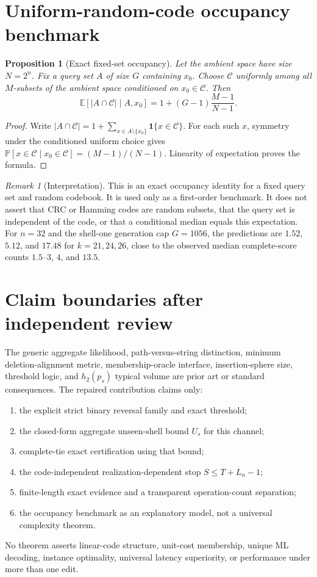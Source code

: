 \documentclass[11pt]{article}
\newtheorem{proposition}[theorem]{Proposition}
\theoremstyle{remark}\newtheorem{remark}[theorem]{Remark}
\newcommand{\C}{\mathcal C}\newcommand{\I}{\mathcal I}\newcommand{\one}{\mathbf 1}
\newcommand{\Prb}{\mathbb P}\newcommand{\ML}{\operatorname{ML}}
\begin{document}
\section{Uniform-random-code occupancy benchmark}
\begin{proposition}[Exact fixed-set occupancy]\label{prop:occupancy}
Let the ambient space have size $N=2^n$. Fix a query set $A$ of size $G$ containing $x_0$. Choose
$\C$ uniformly among all $M$-subsets of the ambient space conditioned on $x_0\in\C$. Then
\begin{equation}
 \mathbb E[|A\cap\C|\mid A,x_0]
 =1+(G-1)\frac{M-1}{N-1}. \label{eq:occupancy}
\end{equation}
\end{proposition}
\begin{proof}
Write $|A\cap\C|=1+\sum_{x\in A\setminus\{x_0\}}\one\{x\in\C\}$. For each such $x$, symmetry
under the conditioned uniform choice gives
$\Prb[x\in\C\mid x_0\in\C]=(M-1)/(N-1)$. Linearity of expectation proves the formula.
\end{proof}
\begin{remark}[Interpretation]
This is an exact occupancy identity for a fixed query set and random codebook. It is used only as a
first-order benchmark. It does not assert that CRC or Hamming codes are random subsets, that the
query set is independent of the code, or that a conditional median equals this expectation. For
$n=32$ and the shell-one generation cap $G=1056$, the predictions are $1.52$, $5.12$, and $17.48$
for $k=21,24,26$, close to the observed median complete-score counts $1.5$--$3$, $4$, and $13.5$.
\end{remark}

\section{Claim boundaries after independent review}
The generic aggregate likelihood, path-versus-string distinction, minimum deletion-alignment
metric, membership-oracle interface, insertion-sphere size, threshold logic, and $h_2(p_s)$ typical
volume are prior art or standard consequences. The repaired contribution claims only:
\begin{enumerate}
\item the explicit strict binary reversal family and exact threshold;
\item the closed-form aggregate unseen-shell bound $U_s$ for this channel;
\item complete-tie exact certification using that bound;
\item the code-independent realization-dependent stop $S\le T+L_n-1$;
\item finite-length exact evidence and a transparent operation-count separation;
\item the occupancy benchmark as an explanatory model, not a universal complexity theorem.
\end{enumerate}
No theorem asserts linear-code structure, unit-cost membership, unique ML decoding, instance
optimality, universal latency superiority, or performance under more than one edit.
\end{document}

